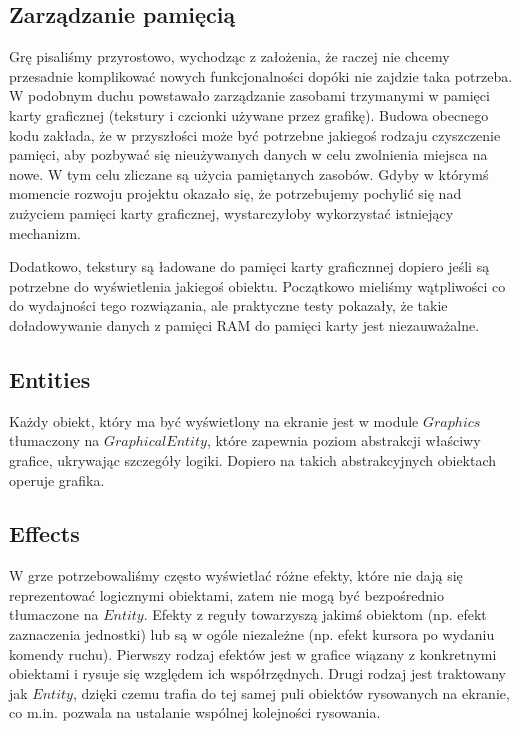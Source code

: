\documentclass[licencjacka]{pracamgr}
\begin{document}
    \subsection{Zarządzanie pamięcią}
      Grę pisaliśmy przyrostowo, wychodząc z założenia, że raczej nie chcemy przesadnie komplikować nowych
      funkcjonalności dopóki nie zajdzie taka potrzeba. W podobnym duchu powstawało zarządzanie zasobami trzymanymi w
      pamięci karty graficznej (tekstury i czcionki używane przez grafikę). Budowa obecnego kodu zakłada, że w
      przyszłości może być potrzebne jakiegoś rodzaju czyszczenie pamięci, aby pozbywać się nieużywanych danych w celu
      zwolnienia miejsca na nowe. W tym celu zliczane są użycia pamiętanych zasobów. Gdyby w którymś momencie rozwoju
      projektu okazało się, że potrzebujemy pochylić się nad zużyciem pamięci karty graficznej, wystarczyłoby
      wykorzystać istniejący mechanizm.

      Dodatkowo, tekstury są ładowane do pamięci karty graficznnej dopiero jeśli są potrzebne do wyświetlenia jakiegoś
      obiektu. Początkowo mieliśmy wątpliwości co do wydajności tego rozwiązania, ale praktyczne testy pokazały, że
      takie doładowywanie danych z pamięci RAM do pamięci karty jest niezauważalne.

    \subsection{Entities}
      Każdy obiekt, który ma być wyświetlony na ekranie jest w module $Graphics$ tłumaczony na $GraphicalEntity$, które
      zapewnia poziom abstrakcji właściwy grafice, ukrywając szczegóły logiki. Dopiero na takich abstrakcyjnych
      obiektach operuje grafika.

    \subsection{Effects}
      W grze potrzebowaliśmy często wyświetlać różne efekty, które nie dają się reprezentować logicznymi obiektami,
      zatem nie mogą być bezpośrednio tłumaczone na $Entity$. Efekty z reguły towarzyszą jakimś obiektom (np. efekt
      zaznaczenia jednostki) lub są w ogóle niezależne (np. efekt kursora po wydaniu komendy ruchu). Pierwszy rodzaj
      efektów jest w grafice wiązany z konkretnymi obiektami i rysuje się względem ich współrzędnych. Drugi rodzaj jest
      traktowany jak $Entity$, dzięki czemu trafia do tej samej puli obiektów rysowanych na ekranie, co m.in. pozwala na
      ustalanie wspólnej kolejności rysowania.
\end{document}
